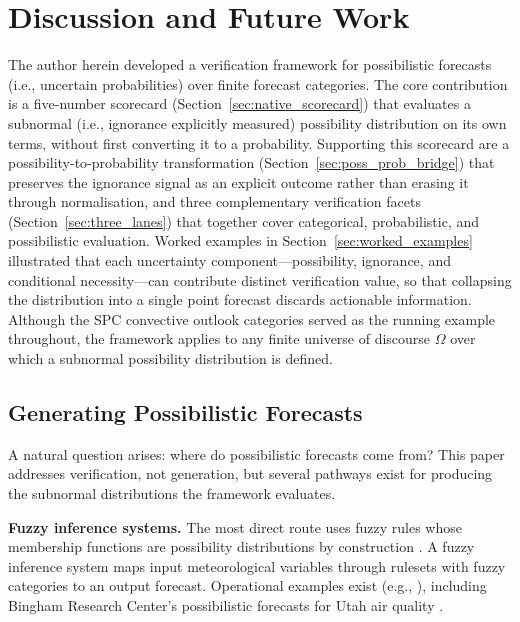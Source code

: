 
\section{Discussion and Future Work}\label{sec:discussion}

The author herein developed a verification framework
for possibilistic forecasts
(i.e., uncertain probabilities) over finite
forecast categories.
The core contribution is a five-number
scorecard (Section~\ref{sec:native_scorecard}) that evaluates a
subnormal (i.e., ignorance explicitly measured)
possibility distribution on its own terms, without first
converting it to a probability. Supporting this scorecard are a
possibility-to-probability transformation
(Section~\ref{sec:poss_prob_bridge}) that preserves the ignorance
signal as an explicit outcome rather than erasing it through
normalisation, and three complementary verification facets
(Section~\ref{sec:three_lanes}) that together cover
categorical, probabilistic, and possibilistic evaluation.
Worked examples in Section~\ref{sec:worked_examples} illustrated
that each uncertainty component---possibility, ignorance, and
conditional necessity---can contribute distinct verification value,
so that collapsing the distribution into a single point forecast
discards actionable information. Although the SPC convective outlook
categories served as the running example throughout, the framework
applies to any finite universe of discourse $\Omega$ over which a
subnormal possibility distribution is defined.

\subsection{Generating Possibilistic Forecasts}%
\label{sec:generation}

A natural question arises: where do possibilistic forecasts come from?
This paper addresses verification, not generation, but several pathways
exist for producing the subnormal distributions the framework evaluates.

\textbf{Fuzzy inference systems.}  The most direct route uses fuzzy
rules whose membership functions are possibility distributions by
construction \citep{Klir1995-va}. A fuzzy inference system maps input
meteorological variables through rulesets with fuzzy
categories to an output forecast.
Operational examples exist
(e.g., \citealt{Asklany2011-yn,Camastra2015-by}),
including Bingham Research Center's possibilistic
forecasts for Utah air
quality \citep{Lawson2024-jb}.

